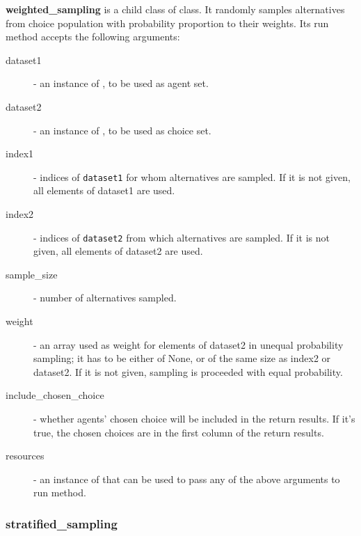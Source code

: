 {{\bf weighted_sampling} is a child class of  class.
It randomly samples alternatives from choice population with
probability proportion to their weights. Its run method accepts the
following arguments:
\begin{description}
\item[dataset1] - an instance of , \datasetindex to be used as agent set.
\item[dataset2] - an instance of , \datasetindex to be used as choice set.
\item[index1] - indices of \verb|dataset1| for whom alternatives are sampled.
If it is not given, all elements of dataset1 are used.
\item[index2] - indices of \verb|dataset2| from which alternatives are
sampled. If it is not given, all elements of dataset2 are used.
\item[sample_size] - number of alternatives sampled.
\item[weight] - an array used as weight for elements of dataset2 in unequal
probability sampling; it has to be either of None, or of the same size as index2 or
dataset2. If it is not given, sampling is proceeded with equal probability.
\item[include_chosen_choice] - whether agents' chosen choice will be included in
the return results. If it's true, the chosen choices are in the first column of
the return results.
\item[resources] - an instance of  that can be used to pass any of
the above arguments to run method.
\end{description}

\subsubsection{stratified_sampling}

}
